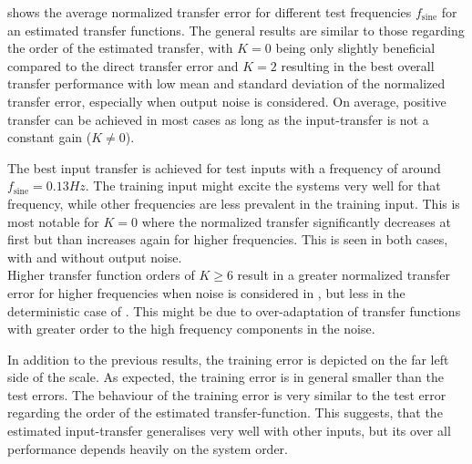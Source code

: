  shows the average normalized transfer error for different test frequencies $f_{\mathrm{sine}}$ for an estimated transfer functions. The general results are similar to those regarding the order of the estimated transfer, with $K=0$ being only slightly beneficial compared to the direct transfer error and $K=2$ resulting in the best overall transfer performance with low mean and standard deviation of the normalized transfer error, especially when output noise is considered. On average, positive transfer can be achieved in most cases as long as the input-transfer is not a constant gain ($K\neq0$).

The best input transfer is achieved for test inputs with a frequency of around $f_{\mathrm{sine}}= 0.13\unit{Hz}$. The training input might excite the systems very well for that frequency, while other frequencies are less prevalent in the training input. This is most notable for $K=0$ where the normalized transfer significantly decreases at first but than increases again for higher frequencies. This is seen in both cases, with and without output noise.\\
Higher transfer function orders of $K\geq6$ result in a greater normalized transfer error for higher frequencies when noise is considered in , but less in the deterministic case of . 
This might be due to over-adaptation of transfer functions with greater order to the high frequency components in the noise.

In addition to the previous results, the training error is depicted on the far left side of the scale. As expected, the training error is in general smaller than the test errors. The behaviour of the training error is very similar to the test error regarding the order of the estimated transfer-function. This suggests, that the estimated input-transfer generalises very well with other inputs, but its over all performance depends heavily on the system order.\\
 
